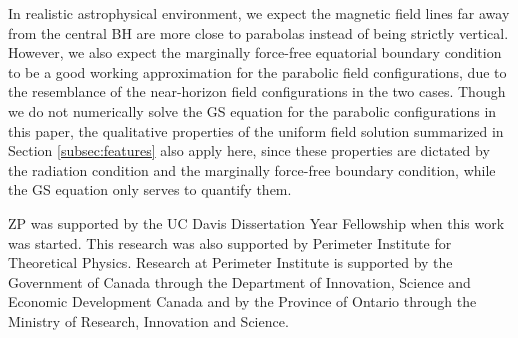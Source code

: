 \documentclass[aps,prd,reprint,nofootinbib, superscriptaddress]{revtex4-1}
\begin{document}
In realistic astrophysical environment, we expect the magnetic field lines far away from the central BH
are more close to parabolas instead of being strictly vertical. However, we also expect the marginally
force-free equatorial boundary condition to be a good working approximation for the parabolic field configurations,
due to the resemblance of the near-horizon field configurations in the two cases.
Though we do not numerically solve the GS equation for the parabolic configurations in this paper, the qualitative
properties of the uniform field solution summarized in Section \ref{subsec:features} also apply here,
since these properties are dictated by the radiation condition
and the marginally force-free boundary condition, while the GS equation only serves to quantify them.


\acknowledgements
ZP was supported by the UC Davis Dissertation Year Fellowship when this work was started.
This research was also supported by Perimeter Institute for Theoretical Physics.
Research at Perimeter Institute is supported by the Government of Canada
through the Department of Innovation, Science and Economic Development Canada
and by the Province of Ontario through the Ministry of Research, Innovation and Science.




\end{document}
